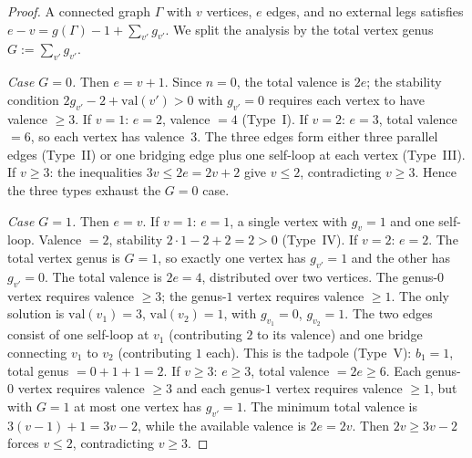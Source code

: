 \begin{proof}
A connected graph $\Gamma$ with $v$ vertices, $e$ edges, and no
external legs satisfies $e - v = g(\Gamma) - 1 + \sum_{v'} g_{v'}$.
We split the analysis by the total vertex genus
$G := \sum_{v'} g_{v'}$.

\emph{Case $G = 0$.} Then $e = v + 1$.
Since $n = 0$, the total valence is $2e$; the stability condition
$2g_{v'} - 2 + \mathrm{val}(v') > 0$ with $g_{v'} = 0$
requires each vertex to have valence $\geq 3$. If $v = 1$:
$e = 2$, valence $= 4$ (Type~I). If $v = 2$: $e = 3$, total
valence $= 6$, so each vertex has valence~$3$. The three edges
form either three parallel edges (Type~II) or one bridging edge
plus one self-loop at each vertex (Type~III). If $v \geq 3$:
the inequalities $3v \leq 2e = 2v + 2$ give $v \leq 2$,
contradicting $v \geq 3$. Hence the three types exhaust the
$G = 0$ case.

\emph{Case $G = 1$.} Then $e = v$.
If $v = 1$: $e = 1$, a single vertex with $g_v = 1$ and one
self-loop. Valence $= 2$, stability
$2 \cdot 1 - 2 + 2 = 2 > 0$ (Type~IV).
If $v = 2$: $e = 2$. The total vertex genus is $G = 1$, so
exactly one vertex has $g_{v'} = 1$ and the other has
$g_{v'} = 0$. The total valence is $2e = 4$, distributed over
two vertices. The genus-$0$ vertex requires
valence $\geq 3$; the genus-$1$ vertex requires valence $\geq 1$.
The only solution is $\mathrm{val}(v_1) = 3$,
$\mathrm{val}(v_2) = 1$, with $g_{v_1} = 0$, $g_{v_2} = 1$.
The two edges consist of one self-loop at $v_1$ (contributing
$2$ to its valence) and one bridge connecting $v_1$ to $v_2$
(contributing $1$ each). This is the tadpole (Type~V):
$b_1 = 1$, total genus $= 0 + 1 + 1 = 2$.
If $v \geq 3$: $e \geq 3$, total valence $= 2e \geq 6$.
Each genus-$0$ vertex requires valence $\geq 3$ and each
genus-$1$ vertex requires valence $\geq 1$, but with $G = 1$
at most one vertex has $g_{v'} = 1$. The minimum total valence
is $3(v-1) + 1 = 3v - 2$, while the available valence is
$2e = 2v$. Then $2v \geq 3v - 2$ forces $v \leq 2$,
contradicting $v \geq 3$.


\end{proof}
